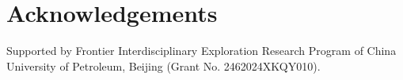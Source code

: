 \section*{Acknowledgements}
Supported by Frontier Interdisciplinary Exploration Research Program of China University of Petroleum, Beijing (Grant No. 2462024XKQY010).
